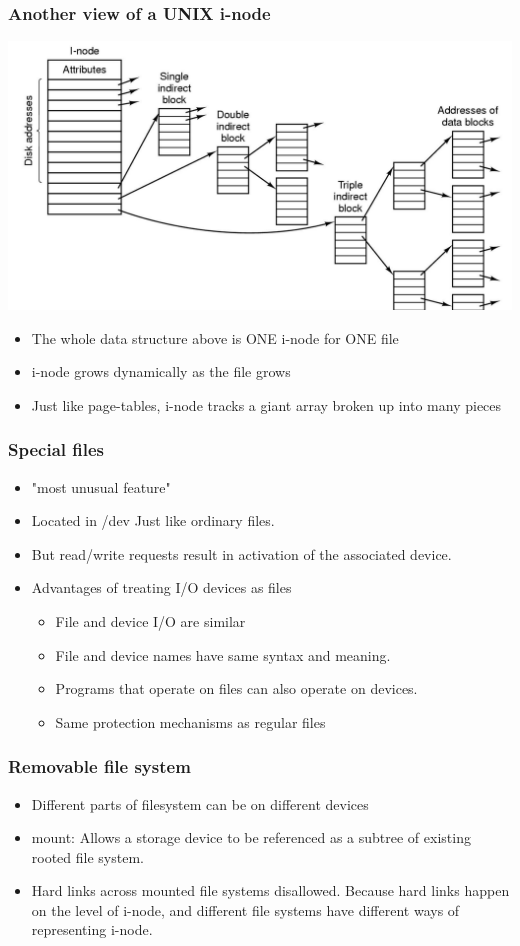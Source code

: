 \documentclass[12pt]{article}
\begin{document}
\subsubsection{Another view of a UNIX i-node}
\includegraphics[width=\textwidth]{AnotherViewOfUnixI-node.png}
\begin{itemize}
    \item The whole data structure above is ONE i-node for ONE file 
    \item i-node grows dynamically as the file grows 
    \item Just like page-tables, i-node tracks a giant array broken up into many pieces
\end{itemize}
\subsubsection{Special files}
\begin{itemize}
    \item "most unusual feature" 
    \item Located in /dev Just like ordinary files. 
    \item But read/write requests result in activation of the associated device. 
    \item Advantages of treating I/O devices as files \begin{itemize}
        \item File and device I/O are similar
        \item File and device names have same syntax and meaning.
        \item Programs that operate on files can also operate on devices.
        \item Same protection mechanisms as regular files
    \end{itemize}
\end{itemize}
\subsubsection{Removable file system}
\begin{itemize}
    \item Different parts of filesystem can be on different devices 
    \item mount: Allows a storage device to be referenced as a subtree of existing rooted file system.
    \item Hard links across mounted file systems disallowed. Because hard links happen on the level of i-node, and different file systems have different ways of representing i-node.
\end{itemize}
\end{document}
